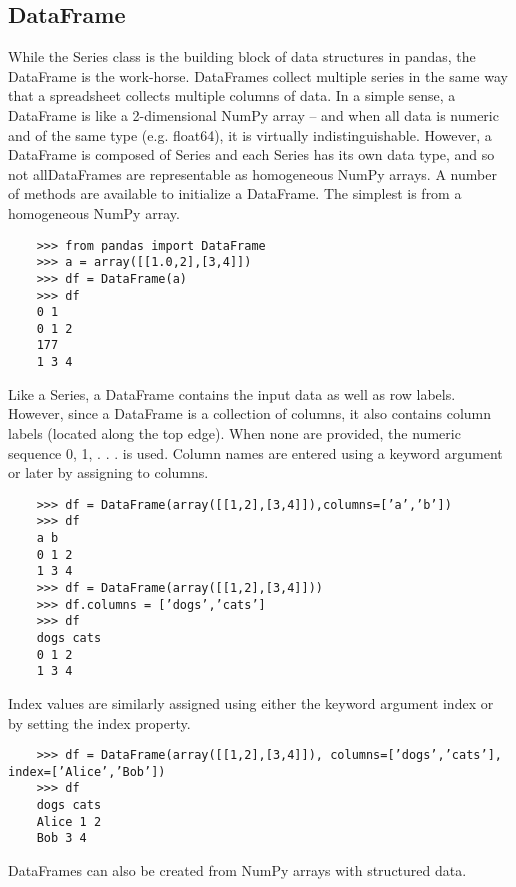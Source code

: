 \documentclass[KSmain.tex]{subfiles}
\begin{document}
\subsection{DataFrame}
While the Series class is the building block of data structures in pandas, the DataFrame is the work-horse.
DataFrames collect multiple series in the same way that a spreadsheet collects multiple columns of data.
In a simple sense, a DataFrame is like a 2-dimensional NumPy array – and when all data is numeric and
of the same type (e.g. float64), it is virtually indistinguishable. However, a DataFrame is composed of
Series and each Series has its own data type, and so not allDataFrames are representable as homogeneous
NumPy arrays.
A number of methods are available to initialize a DataFrame. The simplest is from a homogeneous
NumPy array.
\begin{framed}
	\begin{verbatim}
	>>> from pandas import DataFrame
	>>> a = array([[1.0,2],[3,4]])
	>>> df = DataFrame(a)
	>>> df
	0 1
	0 1 2
	177
	1 3 4
	\end{verbatim}
\end{framed}
Like a Series, a DataFrame contains the input data as well as row labels. However, since a DataFrame
is a collection of columns, it also contains column labels (located along the top edge). When none are
provided, the numeric sequence 0, 1, . . . is used.
Column names are entered using a keyword argument or later by assigning to columns.
\begin{framed}
	\begin{verbatim}
	>>> df = DataFrame(array([[1,2],[3,4]]),columns=[’a’,’b’])
	>>> df
	a b
	0 1 2
	1 3 4
	>>> df = DataFrame(array([[1,2],[3,4]]))
	>>> df.columns = [’dogs’,’cats’]
	>>> df
	dogs cats
	0 1 2
	1 3 4
	\end{verbatim}
\end{framed}
Index values are similarly assigned using either the keyword argument index or by setting the index property.
\begin{framed}
	\begin{verbatim}
	>>> df = DataFrame(array([[1,2],[3,4]]), columns=[’dogs’,’cats’], index=[’Alice’,’Bob’])
	>>> df
	dogs cats
	Alice 1 2
	Bob 3 4
	\end{verbatim}
\end{framed}
DataFrames can also be created from NumPy arrays with structured data.
\end{document}
